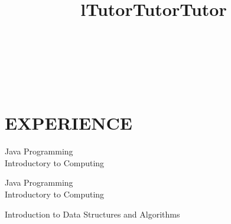 \documentclass[margin]{res}
\begin{document}
\begin{resume}

\begin{format}
\title{l}\\
\\
\body\\
\end{format}

\section{EXPERIENCE}
\title{\textbf{Tutor}}
\begin{position}
Java Programming\\
Introductory to Computing
\end{position}

\title{\textbf{Tutor}}
\begin{position}
Java Programming\\ 
Introductory to Computing
\end{position}

\title{\textbf{Tutor}}
\begin{position}
	Introduction to Data Structures and Algorithms
\end{position}


\end{resume}
\end{document}
